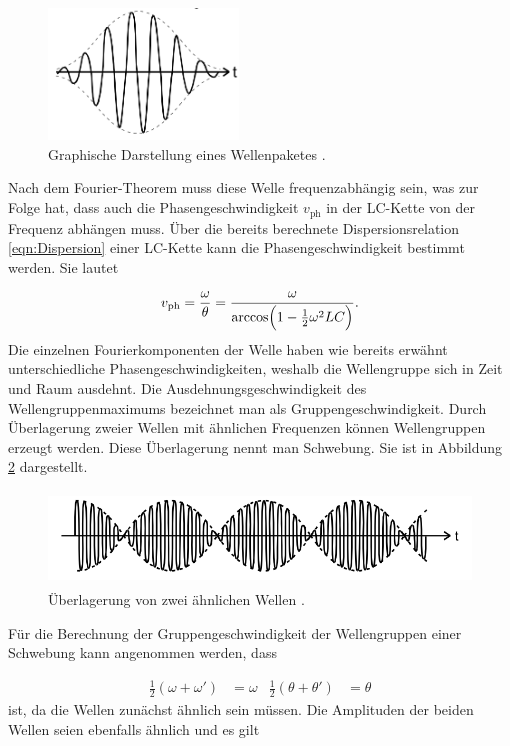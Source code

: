 \begin{figure}
  \centering
  \includegraphics[height = 3.5cm]{Wellengruppe.png}
  \caption{Graphische Darstellung eines Wellenpaketes \cite{anleitung}.}
  \label{fig:WP}
\end{figure}

Nach dem Fourier-Theorem
muss diese Welle frequenzabhängig sein, was zur Folge hat, dass auch die
Phasengeschwindigkeit $v_\text{ph}$ in der LC-Kette von der Frequenz abhängen
muss.
Über die bereits berechnete Dispersionsrelation \eqref{eqn:Dispersion} einer
LC-Kette kann die Phasengeschwindigkeit bestimmt werden.
Sie lautet

\begin{equation}
  v_\text{ph} = \frac{\omega}{\theta} = \frac{\omega}{\arccos \Bigl(
  1-\frac{1}{2}\omega^2LC\Bigr)}.
\end{equation}
Die einzelnen Fourierkomponenten der Welle haben wie bereits erwähnt
unterschiedliche Phasengeschwindigkeiten, weshalb die Wellengruppe sich in Zeit
und Raum ausdehnt. Die Ausdehnungsgeschwindigkeit des Wellengruppenmaximums
bezeichnet man als Gruppengeschwindigkeit.
Durch Überlagerung zweier Wellen mit ähnlichen Frequenzen können Wellengruppen
erzeugt werden. Diese Überlagerung nennt man Schwebung. Sie ist in Abbildung
\ref{fig:Schweb} dargestellt.

\begin{figure}
  \centering
  \includegraphics[height = 2.5cm]{Schwebung.png}
  \caption{Überlagerung von zwei ähnlichen Wellen \cite{anleitung}.}
  \label{fig:Schweb}
\end{figure}

Für die Berechnung der Gruppengeschwindigkeit der Wellengruppen einer Schwebung
kann angenommen werden, dass

\begin{align}
\frac{1}{2}(\omega + \omega') & = \omega & \frac{1}{2}(\theta + \theta') &
= \theta
\label{eqn:SchwebungBedingung}
\end{align}
ist, da die Wellen zunächst ähnlich sein müssen.
Die Amplituden der beiden Wellen seien ebenfalls ähnlich und es gilt

